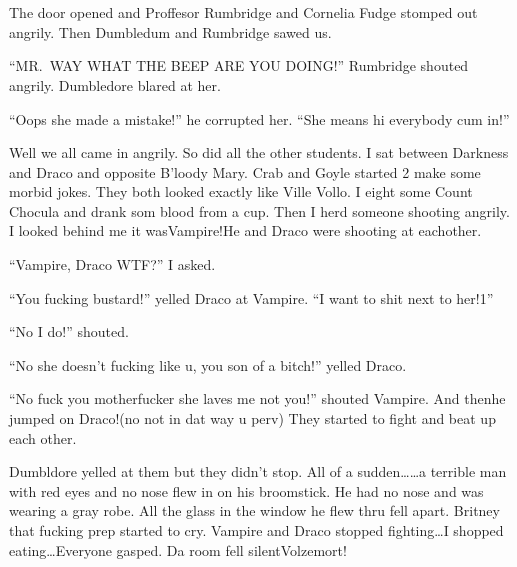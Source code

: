 \section{\chaptername~\thesection}



The door opened and Proffesor Rumbridge and Cornelia Fudge stomped out angrily. Then Dumbledum and Rumbridge sawed us.

\enquote{MR.~WAY WHAT THE BEEP ARE YOU DOING\@!} Rumbridge shouted angrily. Dumbledore blared at her.

\enquote{Oops she made a mistake!} he corrupted her. \enquote{She means hi everybody cum in!}

Well we all came in angrily. So did all the other students. I sat between Darkness and Draco and opposite B'loody Mary. Crab and Goyle started 2 make some morbid jokes. They both looked exactly like Ville Vollo. I eight some Count Chocula and drank som blood from a cup. Then I herd someone shooting angrily. I looked behind me it was\dotfill Vampire!\newline He and Draco were shooting at eachother.

\enquote{Vampire, Draco WTF?} I asked.

\enquote{You fucking bustard!} yelled Draco at Vampire. \enquote{I want to shit next to her!1}

\enquote{No I do!} shouted.

\enquote{No she doesn't fucking like u, you son of a bitch!} yelled Draco.

\enquote{No fuck you motherfucker she laves me not you!} shouted Vampire. And then\dotfill he jumped on Draco!\newline (no not in dat way u perv) They started to fight and beat up each other.

Dumbldore yelled at them but they didn't stop. All of a sudden\ldots\ldots a terrible man with red eyes and no nose flew in on his broomstick. He had no nose and was wearing a gray robe. All the glass in the window he flew thru fell apart. Britney that fucking prep started to cry. Vampire and Draco stopped fighting\ldots I shopped eating\ldots Everyone gasped. Da room fell silent\dotfill\newline\phantom{}\dotfill Volzemort!

